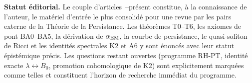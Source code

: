 \textbf{Statut éditorial.} Le couple d'articles~\cite{PT_Article1_Foundations}--présent constitue, à la connaissance de l'auteur, le matériel d'entrée le plus consolidé pour une revue par les pairs externe de la Théorie de la Persistance. Les théorèmes T0--T6, les axiomes de pont BA0--BA5, la dérivation de $\alpha_{\rm EM}$, la courbe de persistance, le quasi-soliton de Ricci et les identités spectrales K2 et A6 y sont énoncés avec leur statut épistémique précis. Les questions restant ouvertes (programme RH-PT, identité exacte $\lambda \leftrightarrow B_0$, promotion cohomologique de K2) sont explicitement marquées comme telles et constituent l'horizon de recherche immédiat du programme.
